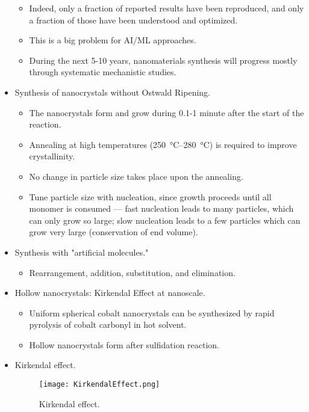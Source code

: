\documentclass[../notes.tex]{subfiles}
\begin{document}
\begin{itemize}
\begin{itemize}
        \item Indeed, only a fraction of reported results have been reproduced, and only a fraction of those have been understood and optimized.
        \item This is a big problem for AI/ML approaches.
        \item During the next 5-10 years, nanomaterials synthesis will progress mostly through systematic mechanistic studies.
    \end{itemize}
    \item Synthesis of nanocrystals without Ostwald Ripening.
    \begin{itemize}
        \item The nanocrystals form and grow during 0.1-1 minute after the start of the reaction.
        \item Annealing at high temperatures (\SIrange{250}{280}{\celsius}) is required to improve crystallinity.
        \item No change in particle size takes place upon the annealing.
        \item Tune particle size with nucleation, since growth proceeds until all monomer is consumed --- fast nucleation leads to many particles, which can only grow so large; slow nucleation leads to a few particles which can grow very large (conservation of end volume).
    \end{itemize}
    \item Synthesis with "artificial molecules."
    \begin{itemize}
        \item Rearrangement, addition, substitution, and elimination.
    \end{itemize}
    \item Hollow nanocrystals: Kirkendal Effect at nanoscale.
    \begin{itemize}
        \item Uniform spherical cobalt nanocrystals can be synthesized by rapid pyrolysis of cobalt carbonyl in hot solvent.
        \item Hollow nanocrystals form after sulfidation reaction.
    \end{itemize}
    \item Kirkendal effect.
    \begin{figure}[h!]
        \centering
        \texttt{[image: KirkendalEffect.png]}
        \caption{Kirkendal effect.}
        \label{fig:KirkendalEffect}
    \end{figure}

\end{itemize}
\end{document}

